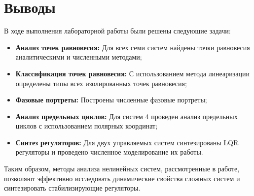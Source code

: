 \section*{Выводы}

В ходе выполнения лабораторной работы были решены следующие задачи:

\begin{itemize}
\item \textbf{Анализ точек равновесия:} Для всех семи систем найдены точки равновесия аналитическими и численными методами;
\item \textbf{Классификация точек равновесия:} С использованием метода линеаризации определены типы всех изолированных точек равновесия;
\item \textbf{Фазовые портреты:} Построены численные фазовые портреты;
\item \textbf{Анализ предельных циклов:} Для систем 4 проведен анализ предельных циклов с использованием полярных координат;
\item \textbf{Синтез регуляторов:} Для двух управляемых систем синтезированы LQR регуляторы и проведено численное моделирование их работы.
\end{itemize}

Таким образом, методы анализа нелинейных систем, рассмотренные в работе, позволяют эффективно исследовать динамические свойства сложных систем и синтезировать стабилизирующие регуляторы.
